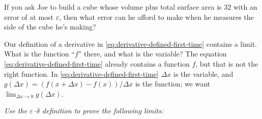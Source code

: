 If you ask Joe to build a cube whose volume plus total surface area is
$32$ with an error of at most $\varepsilon$, then what error
can he afford to make when he measures the side of the cube he's
making?

\problem Our definition of a derivative in 
\eqref{eq:derivative-defined-first-time} contains a limit.  What is the
function ``$f$'' there, and what is the variable?
\answer 
The equation \eqref{eq:derivative-defined-first-time} already
contains a function $f$, but that is not the right function.  In
\eqref{eq:derivative-defined-first-time} $\Delta x$ is the variable,
and $g(\Delta x) = (f(x+\Delta x)-f(x))/\Delta x$ is the function; we
want $\lim_{\Delta x\to 0}g(\Delta x)$.
\endanswer
\begin{center}
  \it Use the $\varepsilon$--$\delta$ definition to prove the following limits:
\end{center}
